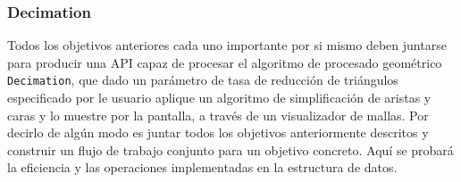 \subsubsection{Decimation}
Todos los objetivos anteriores cada uno importante por si mismo deben juntarse para producir una API capaz de procesar el algoritmo de procesado geométrico \texttt{Decimation}, que dado un parámetro de tasa de reducción de triángulos especificado por le usuario aplique un algoritmo de simplificación de aristas y caras y lo muestre por la pantalla, a través de un visualizador de mallas. Por decirlo de algún modo es juntar todos los objetivos anteriormente descritos y construir un flujo de trabajo conjunto para un objetivo concreto. Aquí se probará la eficiencia y las operaciones implementadas en la estructura de datos.